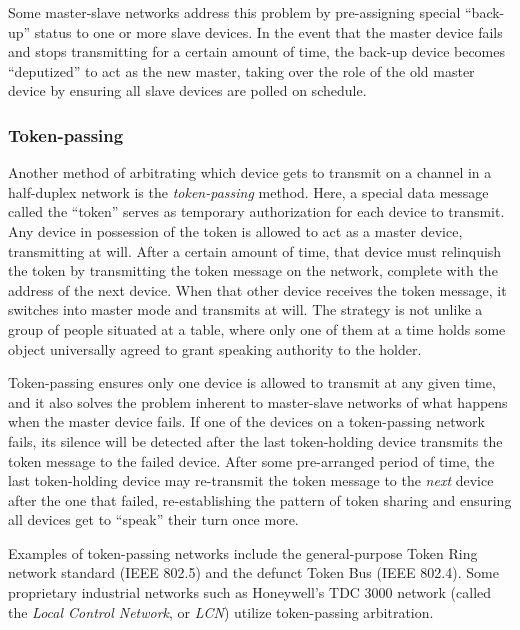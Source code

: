 Some master-slave networks address this problem by pre-assigning special ``back-up'' status to one or more slave devices.  In the event that the master device fails and stops transmitting for a certain amount of time, the back-up device becomes ``deputized'' to act as the new master, taking over the role of the old master device by ensuring all slave devices are polled on schedule.






\filbreak
\subsubsection{Token-passing}

Another method of arbitrating which device gets to transmit on a channel in a half-duplex network is the \textit{token-passing} method.  Here, a special data message called the ``token'' serves as temporary authorization for each device to transmit.  Any device in possession of the token is allowed to act as a master device, transmitting at will.  After a certain amount of time, that device must relinquish the token by transmitting the token message on the network, complete with the address of the next device.  When that other device receives the token message, it switches into master mode and transmits at will.  The strategy is not unlike a group of people situated at a table, where only one of them at a time holds some object universally agreed to grant speaking authority to the holder.  

Token-passing ensures only one device is allowed to transmit at any given time, and it also solves the problem inherent to master-slave networks of what happens when the master device fails.  If one of the devices on a token-passing network fails, its silence will be detected after the last token-holding device transmits the token message to the failed device.  After some pre-arranged period of time, the last token-holding device may re-transmit the token message to the \textit{next} device after the one that failed, re-establishing the pattern of token sharing and ensuring all devices get to ``speak'' their turn once more.

Examples of token-passing networks include the general-purpose Token Ring network standard (IEEE 802.5) and the defunct Token Bus (IEEE 802.4).  Some proprietary industrial networks such as Honeywell's TDC 3000 network (called the \textit{Local Control Network}, or \textit{LCN}) utilize token-passing arbitration.      

